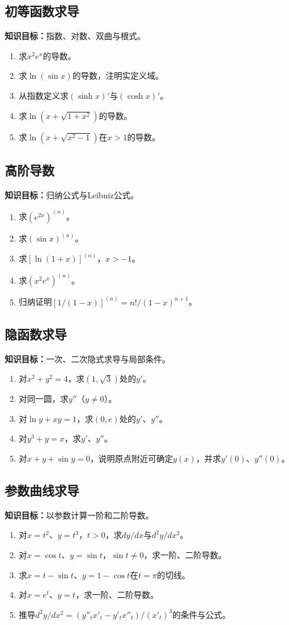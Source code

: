 \documentclass[11pt,a4paper,fontset=fandol]{ctexrep}
\newcommand{\goal}[1]{\textbf{知识目标：}#1\par}
\begin{document}
\subsection{初等函数求导}
\goal{指数、对数、双曲与根式。}
\begin{enumerate}
\item 求$x^2e^x$的导数。
\item 求$\ln(\sin x)$的导数，注明实定义域。
\item 从指数定义求$(\sinh x)'$与$(\cosh x)'$。
\item 求$\ln(x+\sqrt{1+x^2})$的导数。
\item 求$\ln(x+\sqrt{x^2-1})$在$x>1$的导数。
\end{enumerate}
\subsection{高阶导数}
\goal{归纳公式与Leibniz公式。}
\begin{enumerate}
\item 求$(e^{2x})^{(n)}$。
\item 求$(\sin x)^{(n)}$。
\item 求$[\ln(1+x)]^{(n)}$，$x>-1$。
\item 求$(x^2e^x)^{(n)}$。
\item 归纳证明$[1/(1-x)]^{(n)}=n!/(1-x)^{n+1}$。
\end{enumerate}
\subsection{隐函数求导}
\goal{一次、二次隐式求导与局部条件。}
\begin{enumerate}
\item 对$x^2+y^2=4$，求$(1,\sqrt3)$处的$y'$。
\item 对同一圆，求$y''$（$y\ne0$）。
\item 对$\ln y+xy=1$，求$(0,e)$处的$y'$、$y''$。
\item 对$y^3+y=x$，求$y'$、$y''$。
\item 对$x+y+\sin y=0$，说明原点附近可确定$y(x)$，并求$y'(0)$、$y''(0)$。
\end{enumerate}
\subsection{参数曲线求导}
\goal{以参数计算一阶和二阶导数。}
\begin{enumerate}
\item 对$x=t^2$、$y=t^3$，$t>0$，求$dy/dx$与$d^2y/dx^2$。
\item 对$x=\cos t$、$y=\sin t$，$\sin t\ne0$，求一阶、二阶导数。
\item 求$x=t-\sin t$、$y=1-\cos t$在$t=\pi$的切线。
\item 对$x=e^t$、$y=t$，求一阶、二阶导数。
\item 推导$d^2y/dx^2=(y''_t x'_t-y'_t x''_t)/(x'_t)^3$的条件与公式。
\end{enumerate}
\end{document}
